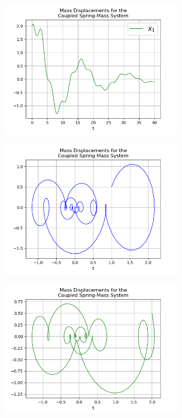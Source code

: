 \documentclass{article}
\begin{document}
\begin{figure}[h!]
\begin{subfigure}[b]{0.32\linewidth}
    \includegraphics[width=\linewidth]{two_springs243.png}
    \caption{}
  \end{subfigure}
  \begin{subfigure}[b]{0.45\linewidth}
    \includegraphics[width=\linewidth]{two_springs244.png}
    \caption{}
  \end{subfigure}
  \begin{subfigure}[b]{0.45\linewidth}
    \includegraphics[width=\linewidth]{two_springs245.png}

\end{subfigure}
\end{figure}
\end{document}
